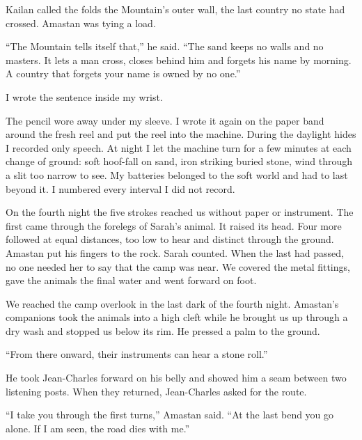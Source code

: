 Kailan called the folds the Mountain's outer wall, the last country no state had crossed. Amastan was tying a load.\par

``The Mountain tells itself that,'' he said. ``The sand keeps no walls and no masters. It lets a man cross, closes behind him and forgets his name by morning. A country that forgets your name is owned by no one.''\par

I wrote the sentence inside my wrist.\par

The pencil wore away under my sleeve. I wrote it again on the paper band around the fresh reel and put the reel into the machine. During the daylight hides I recorded only speech. At night I let the machine turn for a few minutes at each change of ground: soft hoof-fall on sand, iron striking buried stone, wind through a slit too narrow to see. My batteries belonged to the soft world and had to last beyond it. I numbered every interval I did not record.\par

On the fourth night the five strokes reached us without paper or instrument. The first came through the forelegs of Sarah's animal. It raised its head. Four more followed at equal distances, too low to hear and distinct through the ground. Amastan put his fingers to the rock. Sarah counted. When the last had passed, no one needed her to say that the camp was near. We covered the metal fittings, gave the animals the final water and went forward on foot.\par

\ornament

We reached the camp overlook in the last dark of the fourth night. Amastan's companions took the animals into a high cleft while he brought us up through a dry wash and stopped us below its rim. He pressed a palm to the ground.\par

``From there onward, their instruments can hear a stone roll.''\par

He took Jean-Charles forward on his belly and showed him a seam between two listening posts. When they returned, Jean-Charles asked for the route.\par

``I take you through the first turns,'' Amastan said. ``At the last bend you go alone. If I am seen, the road dies with me.''\par

